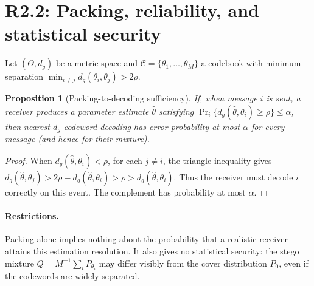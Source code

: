 \documentclass[10pt,a4paper]{article}
\newtheorem{proposition}{Proposition}
\begin{document}
\section{R2.2: Packing, reliability, and statistical security}
Let $(\Theta,d_g)$ be a metric space and $\mathcal C=\{\theta_1,\dots,\theta_M\}$ a codebook with minimum separation $\min_{i\ne j} d_g(\theta_i,\theta_j)>2\rho$.
\begin{proposition}[Packing-to-decoding sufficiency]\label{prop:packing}
If, when message $i$ is sent, a receiver produces a \emph{parameter estimate} $\widehat\theta$ satisfying $\Pr_i\{d_g(\widehat\theta,\theta_i)\ge\rho\}\le\alpha$, then nearest-$d_g$-codeword decoding has error probability at most $\alpha$ for every message (and hence for their mixture).
\end{proposition}
\begin{proof}
When $d_g(\widehat\theta,\theta_i)<\rho$, for each $j\ne i$, the triangle inequality gives $d_g(\widehat\theta,\theta_j)>2\rho-d_g(\widehat\theta,\theta_i)>\rho>d_g(\widehat\theta,\theta_i)$. Thus the receiver must decode $i$ correctly on this event. The complement has probability at most $\alpha$.
\end{proof}
\paragraph{Restrictions.} Packing alone implies nothing about the probability that a realistic receiver attains this estimation resolution. It also gives no statistical security: the stego mixture $Q=M^{-1}\sum_iP_{\theta_i}$ may differ visibly from the cover distribution $P_0$, even if the codewords are widely separated.
\end{document}

